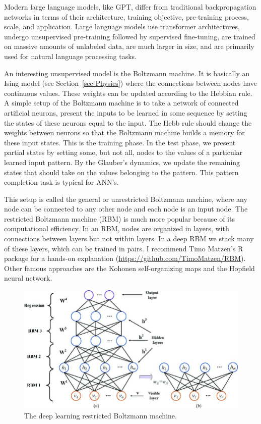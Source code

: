\documentclass[
  a4paper,
  DIV=11,
  numbers=noendperiod]{scrreprt}
\begin{document}
Modern large language models, like GPT, differ from traditional
backpropagation networks in terms of their architecture, training
objective, pre-training process, scale, and application. Large language
models use transformer architectures, undergo unsupervised pre-training
followed by supervised fine-tuning, are trained on massive amounts of
unlabeled data, are much larger in size, and are primarily used for
natural language processing tasks.

An interesting unsupervised model is the Boltzmann machine. It is
basically an Ising model (see Section~\ref{sec-Physics}) where the
connections between nodes have continuous values. These weights can be
updated according to the Hebbian rule. A simple setup of the Boltzmann
machine is to take a network of connected artificial neurons, present
the inputs to be learned in some sequence by setting the states of these
neurons equal to the input. The Hebb rule should change the weights
between neurons so that the Boltzmann machine builds a memory for these
input states. This is the training phase. In the test phase, we present
partial states by setting some, but not all, nodes to the values of a
particular learned input pattern. By the Glauber's dynamics, we update
the remaining states that should take on the values belonging to the
pattern. This pattern completion task is typical for ANN's.

This setup is called the general or unrestricted Boltzmann machine,
where any node can be connected to any other node and each node is an
input node. The restricted Boltzmann machine (RBM) is much more popular
because of its computational efficiency. In an RBM, nodes are organized
in layers, with connections between layers but not within layers. In a
deep RBM we stack many of these layers, which can be trained in pairs. I
recommend Timo Matzen's R package for a hands-on explanation
(\url{https://github.com/TimoMatzen/RBM}). Other famous approaches are
the Kohonen self-organizing maps and the Hopfield neural network.

\begin{figure}

{\centering \includegraphics{media/ch5n/image5.jpg}

}

\caption{\label{fig-ch5n-img5-old-43}The deep learning restricted
Boltzmann machine.}

\end{figure}
\end{document}
